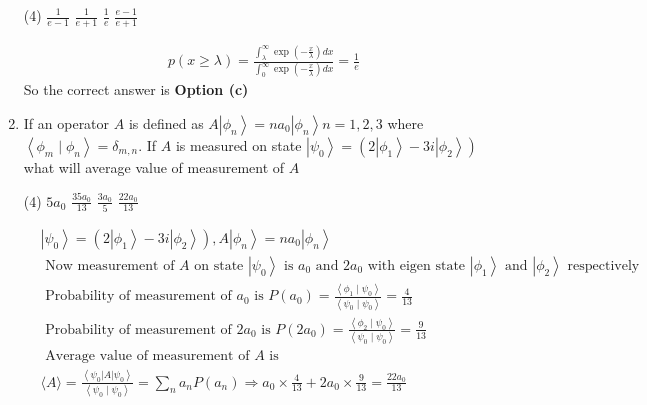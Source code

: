 \begin{enumerate}
 \begin{tasks}(4)
	\task[\textbf{a.}]$\frac{1}{e-1}$
	\task[\textbf{b.}]$\frac{1}{e+1}$
	\task[\textbf{c.}]$\frac{1}{e}$
	\task[\textbf{d.}] $\frac{e-1}{e+1}$ 
\end{tasks}
\begin{answer}
	$$
	\begin{aligned}
	p(x \geq \lambda)=\frac{\int_{\lambda}^{\infty} \exp \left(-\frac{x}{\lambda}\right) d x}{\int_{0}^{\infty} \exp \left(-\frac{x}{\lambda}\right) d x}=\frac{1}{e}
\end{aligned}
$$
So the correct answer is \textbf{Option (c)}
\end{answer}
\item If an operator $A$ is defined as $A\left|\phi_{n}\right\rangle=n a_{0}\left|\phi_{n}\right\rangle n=1,2,3$ where $\left\langle\phi_{m} \mid \phi_{n}\right\rangle=\delta_{m, n}$. If $A$ is measured on state $\left|\psi_{0}\right\rangle=\left(2\left|\phi_{1}\right\rangle-3 i\left|\phi_{2}\right\rangle\right)$ what will average value of measurement of $A$
 \begin{tasks}(4)
	\task[\textbf{a.}]$5 a_{0}$
	\task[\textbf{b.}]$\frac{35 a_{0}}{13}$
	\task[\textbf{c.}]$\frac{3 a_{0}}{5}$
	\task[\textbf{d.}] $\frac{22 a_{0}}{13}$
\end{tasks}
\begin{answer}
	$$
	\begin{aligned}
	&\left|\psi_{0}\right\rangle=\left(2\left|\phi_{1}\right\rangle-3 i\left|\phi_{2}\right\rangle\right), A\left|\phi_{n}\right\rangle=n a_{0}\left|\phi_{n}\right\rangle\\
	&\text { Now measurement of } A \text { on state }\left|\psi_{0}\right\rangle \text { is } a_{0} \text { and } 2 a_{0} \text { with eigen state }\left|\phi_{1}\right\rangle \text { and }\left|\phi_{2}\right\rangle  \text { respectively }\\
	&\text { Probability of measurement of } a_{0} \text { is } P\left(a_{0}\right)=\frac{\left\langle\phi_{1} \mid \psi_{0}\right\rangle}{\left\langle\psi_{0} \mid \psi_{0}\right\rangle}=\frac{4}{13}\\
	&\text { Probability of measurement of } 2 a_{0} \text { is } P\left(2 a_{0}\right)=\frac{\left\langle\phi_{2} \mid \psi_{0}\right\rangle}{\left\langle\psi_{0} \mid \psi_{0}\right\rangle}=\frac{9}{13}\\
	&\text { Average value of measurement of } A \text { is }\\
	&\langle A\rangle=\frac{\left\langle\psi_{0}|A| \psi_{0}\right\rangle}{\left\langle\psi_{0} \mid \psi_{0}\right\rangle}=\sum_{n} a_{n} P\left(a_{n}\right) \Rightarrow a_{0} \times \frac{4}{13}+2 a_{0} \times \frac{9}{13}=\frac{22 a_{0}}{13}

\end{aligned}$$
\end{answer}
\end{enumerate}
